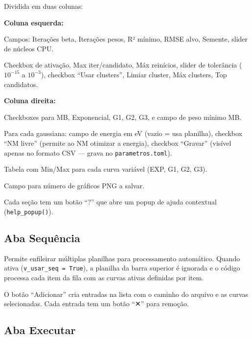 \documentclass[12pt,a4paper]{report}
\newcommand{\code}[1]{\texttt{#1}}
\begin{document}
Dividida em duas colunas:

\textbf{Coluna esquerda:}
\begin{description}[leftmargin=2.5em, style=nextline]
  \item[Seção ``Busca aleatória'']
    Campos: Iterações beta, Iterações pesos, R² mínimo, RMSE alvo,
    Semente, slider de núcleos CPU.
  \item[Seção ``Nelder-Mead'']
    Checkbox de ativação, Max iter/candidato, Máx reinícios, slider de
    tolerância ($10^{-15}$ a $10^{-3}$), checkbox ``Usar clusters'',
    Limiar cluster, Máx clusters, Top candidatos.
\end{description}

\textbf{Coluna direita:}
\begin{description}[leftmargin=2.5em, style=nextline]
  \item[Seção ``Curvas ativas'']
    Checkboxes para MB, Exponencial, G1, G2, G3, e campo de peso mínimo MB.
  \item[Seção ``Energias das gaussianas'']
    Para cada gaussiana: campo de energia em eV (vazio = usa planilha),
    checkbox ``NM livre'' (permite ao NM otimizar a energia),
    checkbox ``Gravar'' (visível apenas no formato CSV — grava no \texttt{parametros.toml}).
  \item[Seção ``Intervalos de beta'']
    Tabela com Min/Max para cada curva variável (EXP, G1, G2, G3).
  \item[Seção ``Saídas'']
    Campo para número de gráficos PNG a salvar.
\end{description}

Cada seção tem um botão ``?'' que abre um popup de ajuda contextual
(\code{help\_popup()}).

\subsection{Aba Sequência}

Permite enfileirar múltiplas planilhas para processamento automático.
Quando ativa (\code{v\_usar\_seq = True}), a planilha da barra superior
é ignorada e o código processa cada item da fila com as curvas ativas
definidas por item.

O botão ``Adicionar'' cria entradas na lista com o caminho do arquivo e
as curvas selecionadas. Cada entrada tem um botão ``✕'' para remoção.

\subsection{Aba Executar}
\end{document}

